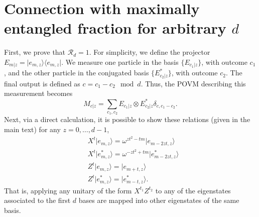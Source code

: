\documentclass[aps,superscriptaddress,twocolumn,twoside,floatfix,pra,nofootinbib,a4paper]{revtex4-2}
\begin{document}
\section{Connection with maximally entangled fraction for arbitrary $d$}\label{App:SFqudit}
First, we prove that $\mathcal{R}_d=1$. For simplicity, we define the projector $E_{m|z}=\vert e_{m,z}\rangle \langle e_{m,z}\vert$. We measure one particle in the basis $\{E_{c_1|z}\}$, with outcome $c_1$, and the other particle in the conjugated basis $\{E^*_{c_2|z}\}$, with outcome $c_2$. The final output is defined as $c=c_1-c_2 \mod{d}$. Thus, the POVM describing this measurement becomes
	\begin{equation}
	M_{c|z}=\sum_{c_1,c_2} E_{c_1|z}\otimes E_{c_2|z}^* \delta_{c,c_1-c_2}.
	\end{equation}
	Next, via a direct calculation, it is possible to show these relations (given in the main text) for any $z=0,\ldots,d-1$,
	\begin{align}\nonumber \label{lemma}
	& X^t \vert{e_{m,z}\rangle}=\omega^{zt^2-tm} \vert{e_{m-2zt,z}\rangle}\\\nonumber
	& X^t \vert{e^*_{m,z}\rangle}=\omega^{-zt^2+tm} \vert{e^*_{m-2zt,z}\rangle}\\\nonumber
	& Z^t \vert{e_{m,z}\rangle}= \vert{e_{m+t,z}\rangle}\\
	& Z^t \vert{e^*_{m,z}\rangle}=\vert{e^*_{m-t,z}\rangle}.
	\end{align}
	That is, applying any unitary of the form $X^{t_1}Z^{t_2}$ to any of the eigenstates associated to the first $d$ bases are mapped into other eigenstates of the same basis. 
	
\end{document}
